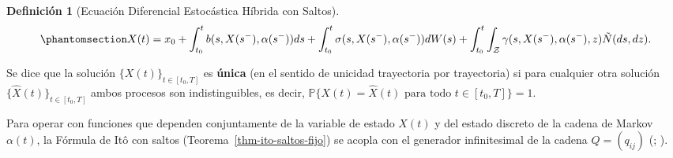 \documentclass[
  spanish,
  us-letterpaper,
]{scrreprt}
\numberwithin{equation}{section}
\theoremstyle{plain}
\theoremstyle{plain}
\theoremstyle{plain}
\theoremstyle{definition}
\newtheorem{definition}{Definición}[chapter]
\theoremstyle{remark}
\begin{document}
\begin{definition}[Ecuación Diferencial Estocástica Híbrida con
Saltos]
\begin{equation}\phantomsection\label{eq-ede-hibrida-int}{
X(t) = x_0 + \int_{t_0}^t b(s, X(s^-), \alpha(s^-)) ds + \int_{t_0}^t \sigma(s, X(s^-), \alpha(s^-)) dW(s) + \int_{t_0}^t \int_{\mathcal{Z}} \gamma(s, X(s^-), \alpha(s^-), z) \tilde{N}(ds, dz).
}\end{equation}

Se dice que la solución \(\{X(t)\}_{t \in [t_0, T]}\) es \textbf{única}
(en el sentido de unicidad trayectoria por trayectoria) si para
cualquier otra solución \(\{\widehat{X}(t)\}_{t \in [t_0, T]}\) ambos
procesos son indistinguibles, es decir,
\(\mathbb{P}\{X(t) = \widehat{X}(t) \text{ para todo } t \in [t_0, T]\} = 1\).

\end{definition}

Para operar con funciones que dependen conjuntamente de la variable de
estado \(X(t)\) y del estado discreto de la cadena de Markov
\(\alpha(t)\), la Fórmula de Itô con saltos
(Teorema~\ref{thm-ito-saltos-fijo}) se acopla con el generador
infinitesimal de la cadena \(Q = (q_{ij})\)
(;
).
\end{document}
